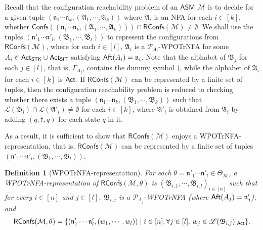 \documentclass[preprint,12pt]{elsarticle}
\newcommand\rectangled[1]{\tikz[baseline=(torect.base)]{
    \node[shape = rectangle, draw, inner sep=0pt, outer sep = 0pt] (torect) {#1}
    }
}
\newcommand{\mrectangled}[1]{\text{\rectangled{\ensuremath{#1}}}}
\newcommand{\mhcancel}[1]{\mrectangled{#1}}
\newtheorem{definition}{Definition}
\newcommand\Mm{{\mathcal{M} }}
\newcommand\Pp{{\mathcal{P} }}
\newcommand\act{{\sf Act}}
\newcommand\aft{{\sf Aft}}
\newcommand\singletask{{\sf STK}}
\newcommand\singleinstance{{\sf SIT}}
\newcommand{\AMASS}{\textsf{ASM}}
\newcommand\confs{{\mathsf{Confs} }}
\newcommand\aname{\mathfrak{n}}
\newcommand\RConfs{\mathsf{RConfs}}
\newcommand\Aut{{\mathfrak{A} }}
\newcommand\AutB{{\mathfrak{B} }}
\newcommand\Lang{{\mathscr{L} }}
\newcommand{\WOTrNFA}{\textsf{WPOTrNFA}}
\newcommand{\NFA}{\textsf{NFA}}
\begin{document}
Recall that the configuration reachability problem of an $\AMASS$ $\Mm$ is to decide for a given tuple $(\aname_1 \cdots \aname_k, (\Aut_1,\cdots, \Aut_k))$ where $\Aut_i$ is an {\NFA} for each $i \in [k]$, whether $\confs((\aname_1 \cdots \aname_k, (\Aut_1,\cdots, \Aut_k))) \cap \RConfs(\Mm) \neq \emptyset$. 
%
We shall use the tuples $(\aname'_1 \cdots \aname'_l, (\AutB_{1},\cdots,\AutB_{l}))$ to represent the configurations from $\RConfs(\Mm)$, where for each $i \in [l]$, $\Aut_i$ is a $\Pp_{A_i}$-{\WOTrNFA} for some $A_i \in \act_\singletask \cup \act_\singleinstance$ satisfying $\aft(A_i) = \aname_i$.  Note that the alphabet of $\AutB_{j}$ for each $j \in [l]$, that is, $\Gamma_{A_j}$, contains the dummy symbol $\dag$,  while the alphabet of $\Aut_i$  for each $i \in [k]$ is $\act$. If $\RConfs(\Mm)$ can be represented by a finite set of tuples, then the configuration reachability problem is reduced to checking whether there exists a tuple $(\aname_1 \cdots \aname_k, (\AutB_{1},\cdots,\AutB_{k}))$ such that $\Lang(\AutB_i) \cap \Lang(\Aut'_i) \neq \emptyset$ for each $i \in [k]$, where $\Aut'_i$ is obtained from $\Aut_i$ by adding $(q, \dag, q)$ for each state $q$ in it. 

As a result, it is sufficient to show that $\RConfs(\Mm)$ enjoys a {\WOTrNFA}-representation, that is, $\RConfs(\Mm)$ can be represented by a finite set of tuples $(\aname'_1 \cdots \aname'_l, (\AutB_{1},\cdots,\AutB_{l}))$. 

\begin{definition}[{\WOTrNFA}-representation]
    For each $\theta = \aname'_1 \cdots \aname'_l \in \Theta_\Mm$, a {\WOTrNFA}-representation of $\RConfs(\Mm, \theta)$ is $(\AutB_{i, 1},\cdots,\AutB_{i, l})_{i \in [n]}$ such that for every $i \in [n]$ and $j \in [l]$,  $\AutB_{i, j}$ is a $\Pp_{A_j}$-{\WOTrNFA} (where $\aft(A_j) = \aname'_j$), and 
    $$\RConfs(\Mm, \theta) =\{(\aname'_1 \cdots \aname'_{l}, (w_1, \cdots, w_{l})) \mid  i \in [n], \forall j \in [l].\ w_j \in \Lang(\AutB_{i, j})|_{\act}\}.$$
\end{definition}
\end{document}
